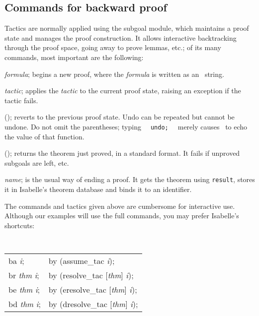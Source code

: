 \subsection{Commands for backward proof}
Tactics are normally applied using the subgoal module, which maintains a
proof state and manages the proof construction.  It allows interactive
backtracking through the proof space, going away to prove lemmas, etc.; of
its many commands, most important are the following:
\begin{ttdescription}
\item[\ttindex{Goal} {\it formula}; ] 
begins a new proof, where the {\it formula\/} is written as an \ML\ string.

\item[\ttindex{by} {\it tactic}; ] 
applies the {\it tactic\/} to the current proof
state, raising an exception if the tactic fails.

\item[\ttindex{undo}(); ]
  reverts to the previous proof state.  Undo can be repeated but cannot be
  undone.  Do not omit the parentheses; typing {\tt\ \ undo;\ \ } merely
  causes \ML\ to echo the value of that function.

\item[\ttindex{result}();]
returns the theorem just proved, in a standard format.  It fails if
unproved subgoals are left, etc.

\item[\ttindex{qed} {\it name};] is the usual way of ending a proof.
  It gets the theorem using \texttt{result}, stores it in Isabelle's
  theorem database and binds it to an \ML{} identifier.

\end{ttdescription}
The commands and tactics given above are cumbersome for interactive use.
Although our examples will use the full commands, you may prefer Isabelle's
shortcuts:
\begin{center} \tt
{}   
\begin{tabular}{l@{\qquad\rm abbreviates\qquad}l}
    ba {\it i};           & by (assume_tac {\it i}); \\

    br {\it thm} {\it i}; & by (resolve_tac [{\it thm}] {\it i}); \\

    be {\it thm} {\it i}; & by (eresolve_tac [{\it thm}] {\it i}); \\

    bd {\it thm} {\it i}; & by (dresolve_tac [{\it thm}] {\it i}); 
\end{tabular}
\end{center}

